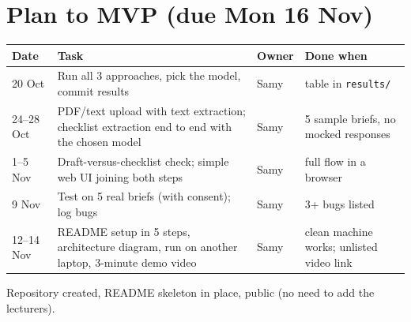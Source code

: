\documentclass[10pt]{article}
\begin{document}
\section{Plan to MVP (due Mon 16 Nov)}
\footnotesize
\begin{tabular}{@{}p{1.5cm}p{8.2cm}p{1.2cm}p{4.2cm}@{}}
\toprule
\textbf{Date} & \textbf{Task} & \textbf{Owner} & \textbf{Done when} \\
\midrule
20 Oct & Run all 3 approaches, pick the model, commit results & Samy & table in \texttt{results/} \\
24--28 Oct & PDF/text upload with text extraction; checklist extraction end to end with the chosen model & Samy & 5 sample briefs, no mocked responses \\
1--5 Nov & Draft-versus-checklist check; simple web UI joining both steps & Samy & full flow in a browser \\
9 Nov & Test on 5 real briefs (with consent); log bugs & Samy & 3+ bugs listed \\
12--14 Nov & README setup in 5 steps, architecture diagram, run on another laptop, 3-minute demo video & Samy & clean machine works; unlisted video link \\
\bottomrule
\end{tabular}
\small
Repository created, README skeleton in place, public (no need to add the lecturers).
\end{document}
